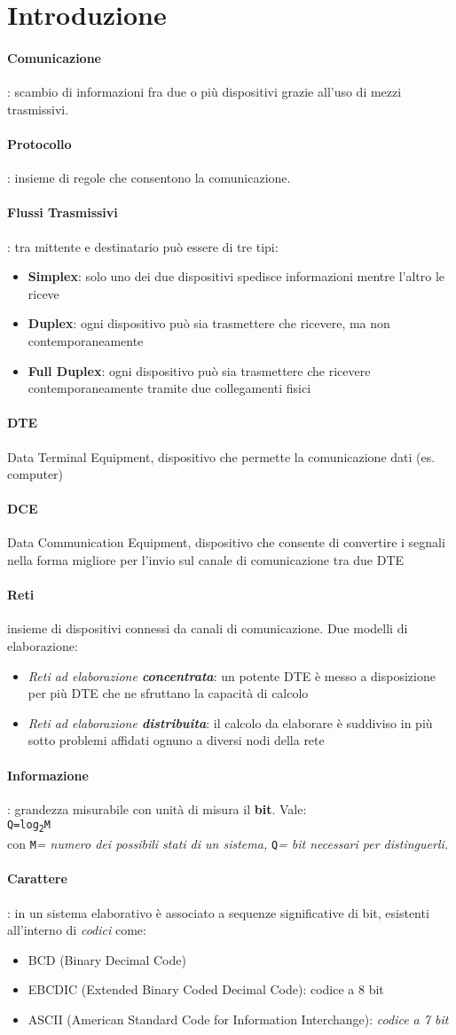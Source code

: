 \documentclass[a4paper,11pt]{article}
\def\code#1{\texttt{#1}}
\def\para#1{\paragraph{#1}\label{#1}}
\begin{document}
\tableofcontents
\newpage

\section{Introduzione}
\para{Comunicazione}: scambio di informazioni fra due o più dispositivi grazie all'uso di mezzi trasmissivi. 
\para{Protocollo}: insieme di regole che consentono la comunicazione.
\para{Flussi Trasmissivi}: tra mittente e destinatario può essere di tre tipi:
\begin{itemize}
\item\textbf{Simplex}: solo uno dei due dispositivi spedisce informazioni mentre l'altro le riceve
\item\textbf{Duplex}: ogni dispositivo può sia trasmettere che ricevere, ma non contemporaneamente
\item\textbf{Full Duplex}: ogni dispositivo può sia trasmettere che ricevere contemporaneamente tramite due collegamenti fisici
\end{itemize}
\para{DTE} Data Terminal Equipment, dispositivo che permette la comunicazione dati (es. computer)
\para{DCE} Data Communication Equipment, dispositivo che consente di convertire i segnali nella forma migliore per l'invio sul canale di comunicazione tra due DTE
\para{Reti} insieme di dispositivi connessi da canali di comunicazione. Due modelli di elaborazione:
\begin{itemize}
\item\textit{Reti ad elaborazione\textbf{ concentrata}}: un potente DTE è messo a disposizione per più DTE che ne sfruttano la capacità di calcolo
\item\textit{Reti ad elaborazione \textbf{distribuita}}: il calcolo da elaborare è suddiviso in più sotto problemi affidati ognuno a diversi nodi della rete
\end{itemize}
\para{Informazione}: grandezza misurabile con unità di misura il \textbf{bit}. Vale:\\ \code{Q=log\textsubscript{2}M}\\
con \code{M}\textit{= numero dei possibili stati di un sistema,} \code{Q}\textit{= bit necessari per distinguerli.} 
\para{Carattere}: in un sistema elaborativo è associato a sequenze significative di bit, esistenti all'interno di \textit{codici} come:
\begin{itemize}
\item BCD (Binary Decimal Code)
\item EBCDIC (Extended Binary Coded Decimal Code): codice a 8 bit
\item ASCII (American Standard Code for Information Interchange): \textit{codice a 7 bit}
\end{itemize}
\end{document}
